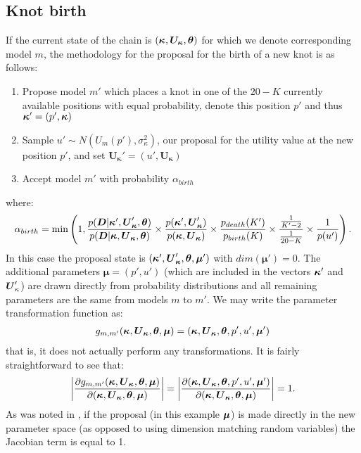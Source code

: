 \subsection{Knot birth}
\label{sec:Knot_birth}

If the current state of the chain is \((\boldsymbol{\kappa}, \boldsymbol{U_\kappa}, \boldsymbol{\theta})\) for which we denote
corresponding model \(m\), the methodology for the proposal for the birth of a new knot is as follows:
\begin{enumerate}
  \item Propose model \(m'\) which places a knot in one of the \(20 - K\) currently available positions with equal
  probability, denote this position \(p'\) and thus \(\boldsymbol{\kappa}' = (p', \boldsymbol{\kappa})\)
  \item Sample \(u' \sim N(U_m(p'), \sigma^2_\kappa)\), our proposal for the
  utility value at the new position \(p'\), and set \(\boldsymbol{U_{\kappa}'} = (u', \boldsymbol{U_\kappa})\)
  \item Accept model \(m'\) with probability \(\alpha_{birth}\)
\end{enumerate}
where:
\begin{align} 
\alpha_{birth} = \min\left(1, 
\frac{p(\boldsymbol{D} | \boldsymbol{\kappa}', \boldsymbol{U}_{\boldsymbol{\kappa}}', \boldsymbol{\theta})}{p(\boldsymbol{D} | \boldsymbol{\kappa}, \boldsymbol{U}_{\boldsymbol{\kappa}}, \boldsymbol{\theta})}
\times \frac{p(\boldsymbol{\kappa}', \boldsymbol{U}_{\boldsymbol{\kappa}}')}{p(\boldsymbol{\kappa}, \boldsymbol{U}_{\boldsymbol{\kappa}})} \times
\frac{p_{death}(K')}{p_{birth}(K)} \times 
\frac{\frac{1}{K' - 2}}{\frac{1}{20 - K}} \times 
\frac{1}{p(u')}
\right).
\label{eq:birth}
\end{align}
In this case the proposal state is \((\boldsymbol{\kappa}', \boldsymbol{U}_{\boldsymbol{\kappa}}', \boldsymbol{\theta}, \boldsymbol{\mu}')\)
with \(dim(\boldsymbol{\mu}') = 0\). The additional parameters \(\boldsymbol{\mu} = (p', u')\) (which are included in
the vectors \(\boldsymbol{\kappa}'\) and \(\boldsymbol{U}_\kappa'\)) are drawn directly from probability distributions and all
remaining parameters are the same from models \(m\) to \(m'\). We may write the parameter transformation function as:
\begin{align} 
g_{m, m'}(\boldsymbol{\kappa}, \boldsymbol{U}_{\boldsymbol{\kappa}}, \boldsymbol{\theta}, \boldsymbol{\mu}) 
= (\boldsymbol{\kappa}, \boldsymbol{U}_{\boldsymbol{\kappa}}, \boldsymbol{\theta}, p', u', \boldsymbol{\mu}')
\end{align}
that is, it does not actually perform any transformations. It is fairly straightforward to see that:
\begin{align} 
\left| \frac{\partial g_{m, m'}(\boldsymbol{\kappa}, \boldsymbol{U}_{\boldsymbol{\kappa}}, \boldsymbol{\theta}, \boldsymbol{\mu})}
{\partial (\boldsymbol{\kappa}, \boldsymbol{U}_{\boldsymbol{\kappa}}, \boldsymbol{\theta}, \boldsymbol{\mu})} \right| = 
\left| \frac{\partial (\boldsymbol{\kappa}, \boldsymbol{U}_{\boldsymbol{\kappa}}, \boldsymbol{\theta}, p', u', \boldsymbol{\mu}')}
{\partial (\boldsymbol{\kappa}, \boldsymbol{U}_{\boldsymbol{\kappa}}, \boldsymbol{\theta}, \boldsymbol{\mu})} \right| = 1.
\end{align}
As was noted in \cite{punska1999}, if the proposal (in this example \(\boldsymbol{\mu}\)) is made directly in the new parameter
space (as opposed to using dimension matching random variables) the Jacobian term is equal to 1.

